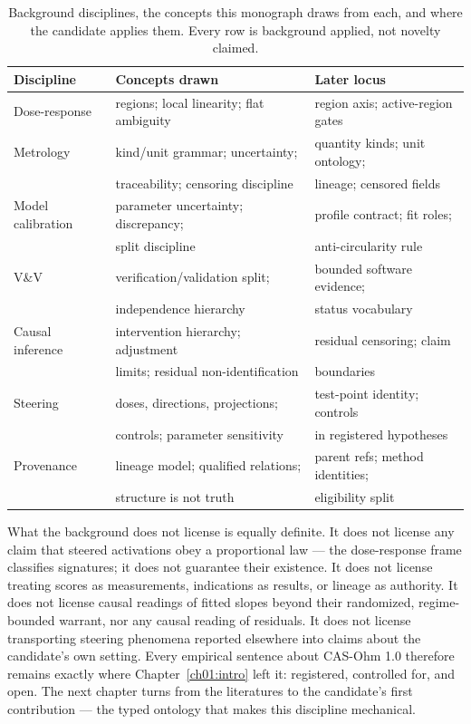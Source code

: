 \begin{table}[ht]
\centering
\small
\begin{tabular}{@{}lll@{}}
\toprule
Discipline & Concepts drawn & Later locus \\
\midrule
Dose-response \cite{ritz} & regions; local linearity; flat ambiguity & region axis; active-region gates \\
Metrology \cite{vim,gum} & kind/unit grammar; uncertainty; & quantity kinds; unit ontology; \\
 & traceability; censoring discipline & lineage; censored fields \\
Model calibration \cite{kennedyohagan} & parameter uncertainty; discrepancy; & profile contract; fit roles; \\
 & split discipline & anti-circularity rule \\
V\&V \cite{sargent} & verification/validation split; & bounded software evidence; \\
 & independence hierarchy & status vocabulary \\
Causal inference \cite{pearl} & intervention hierarchy; adjustment & residual censoring; claim \\
 & limits; residual non-identification & boundaries \\
Steering \cite{zourepe} & doses, directions, projections; & test-point identity; controls \\
 & controls; parameter sensitivity & in registered hypotheses \\
Provenance \cite{prov} & lineage model; qualified relations; & parent refs; method identities; \\
 & structure is not truth & eligibility split \\
\bottomrule
\end{tabular}
\caption{Background disciplines, the concepts this monograph draws from each, and where the candidate applies them. Every row is background applied, not novelty claimed.}
\label{ch02:tab:map}
\end{table}

What the background does not license is equally definite. It does not license any claim that steered activations obey a proportional law --- the dose-response frame classifies signatures; it does not guarantee their existence. It does not license treating scores as measurements, indications as results, or lineage as authority. It does not license causal readings of fitted slopes beyond their randomized, regime-bounded warrant, nor any causal reading of residuals. It does not license transporting steering phenomena reported elsewhere into claims about the candidate's own setting. Every empirical sentence about CAS-Ohm 1.0 therefore remains exactly where Chapter~\ref{ch01:intro} left it: registered, controlled for, and open. The next chapter turns from the literatures to the candidate's first contribution --- the typed ontology that makes this discipline mechanical.
